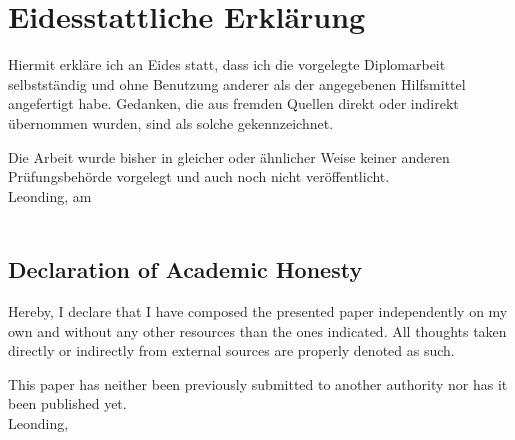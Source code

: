 \section*{Eidesstattliche Erklärung}
Hiermit erkläre ich an Eides statt, dass ich die vorgelegte Diplomarbeit selbstständig und ohne Benutzung anderer als der angegebenen Hilfsmittel angefertigt habe. Gedanken, die aus fremden Quellen direkt oder indirekt übernommen wurden, sind als solche gekennzeichnet.

Die Arbeit wurde bisher in gleicher oder ähnlicher Weise keiner anderen Prüfungsbehörde vorgelegt und auch noch nicht veröffentlicht. \\[1em]
Leonding, am \duedatede \\[5em]
\ifthenelse{\isundefined{\firstauthor}}{}{\firstauthor}
\ifthenelse{\isundefined{\secondauthor}}{}{\kern-1ex, \secondauthor} \\[5em]


\begin{otherlanguage}{english}
\section*{Declaration of Academic Honesty}
Hereby, I declare that I have composed the presented paper independently on my own and without any other resources than the ones indicated. All thoughts taken directly or indirectly from external sources are properly denoted as such.

This paper has neither been previously submitted to another authority nor has it been published yet. \\[1em]
Leonding, \duedateen \\[5em]
\ifthenelse{\isundefined{\firstauthor}}{}{\firstauthor}
\ifthenelse{\isundefined{\secondauthor}}{}{\kern-1ex, \secondauthor}
\end{otherlanguage}


